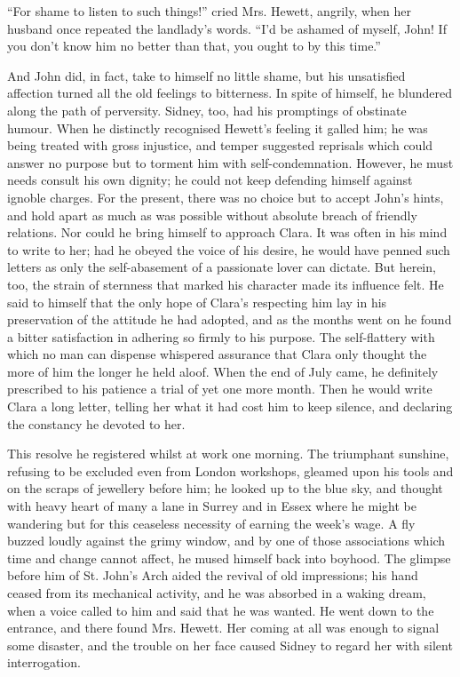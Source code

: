 ``For shame to listen to such things!'' cried Mrs. Hewett, angrily, when
her husband once repeated the landlady's words. ``I'd be ashamed of
myself, John! If you don't know him no better than that, you ought to by
this time.''

And John did, in fact, take to himself no little shame, but his
unsatisfied affection turned all the old feelings to bitterness. In
spite of himself, he blundered along the path of perversity. Sidney,
too, had his promptings of obstinate humour. When he distinctly
recognised Hewett's feeling it galled him; he was being treated with
gross injustice, and temper suggested reprisals which could answer no
purpose but to torment him with self-condemnation. However, he must
needs consult his own dignity; he could not keep defending himself
against ignoble charges. For the present, there was no choice but to
accept John's hints, and hold apart as much as was
{\protect\hypertarget{218}{}{}}possible without absolute breach of
friendly relations. Nor could he bring himself to approach Clara. It was
often in his mind to write to her; had he obeyed the voice of his
desire, he would have penned such letters as only the self-abasement of
a passionate lover can dictate. But herein, too, the strain of sternness
that marked his character made its influence felt. He said to himself
that the only hope of Clara's respecting him lay in his preservation of
the attitude he had adopted, and as the months went on he found a bitter
satisfaction in adhering so firmly to his purpose. The self-flattery
with which no man can dispense whispered assurance that Clara only
thought the more of him the longer he held aloof. When the end of July
came, he definitely prescribed to his patience a trial of yet one more
month. Then he would write Clara a long letter, telling her what it had
cost him to keep silence, and declaring the constancy he devoted to her.

This resolve he registered whilst at work one morning. The triumphant
sunshine, {\protect\hypertarget{219}{}{}}refusing to be excluded even
from London workshops, gleamed upon his tools and on the scraps of
jewellery before him; he looked up to the blue sky, and thought with
heavy heart of many a lane in Surrey and in Essex where he might be
wandering but for this ceaseless necessity of earning the week's wage. A
fly buzzed loudly against the grimy window, and by one of those
associations which time and change cannot affect, he mused himself back
into boyhood. The glimpse before him of St. John's Arch aided the
revival of old impressions; his hand ceased from its mechanical
activity, and he was absorbed in a waking dream, when a voice called to
him and said that he was wanted. He went down to the entrance, and there
found Mrs. Hewett. Her coming at all was enough to signal some disaster,
and the trouble on her face caused Sidney to regard her with silent
interrogation.

